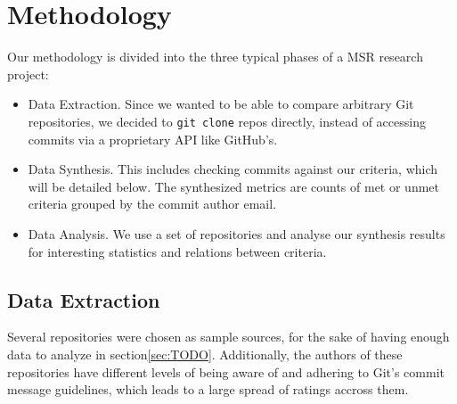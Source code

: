 \section{Methodology}

Our methodology is divided into the three typical phases of a MSR research project:


\begin{itemize}
  \item Data Extraction. Since we wanted to be able to compare arbitrary Git repositories, we decided to \texttt{git clone} repos directly, instead of accessing commits via a proprietary API like GitHub's.
  \item Data Synthesis. This includes checking commits against our criteria, which will be detailed below. The synthesized metrics are counts of met or unmet criteria grouped by the commit author email.
  \item Data Analysis. We use a set of repositories and analyse our synthesis results for interesting statistics and relations between criteria.
\end{itemize}


\subsection{Data Extraction}

Several repositories were chosen as sample sources, for the sake of having enough data to analyze in section\ref{sec:TODO}. Additionally, the authors of these repositories have different levels of being aware of and adhering to Git's commit message guidelines\cite{OffGuide}, which leads to a large spread of ratings accross them.

